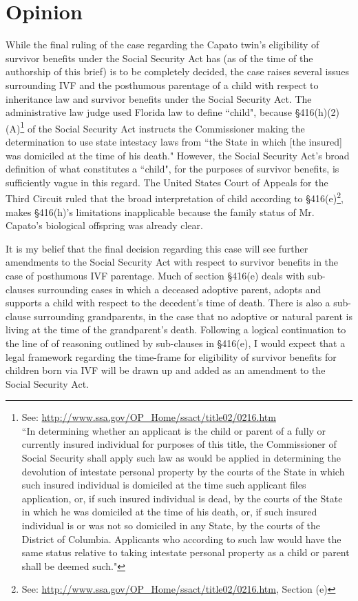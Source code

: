 \documentclass[letterpaper,10pt,twoside]{article}
\begin{document}
\section*{Opinion}
While the final ruling of the case regarding the Capato twin's eligibility of survivor benefits under the Social Security Act has (as of the time of the authorship of this brief) is to be completely decided, the case raises several issues surrounding IVF and the posthumous parentage of a child with respect to inheritance law and survivor benefits under the Social Security Act. The administrative law judge used Florida law to define ``child", because \S 416(h)(2)(A)\footnote{See: \url{http://www.ssa.gov/OP_Home/ssact/title02/0216.htm}\\``In determining whether an applicant is the child or parent of a fully or currently insured individual for purposes of this title, the Commissioner of Social Security shall apply such law as would be applied in determining the devolution of intestate personal property by the courts of the State in which such insured individual is domiciled at the time such applicant files application, or, if such insured individual is dead, by the courts of the State in which he was domiciled at the time of his death, or, if such insured individual is or was not so domiciled in any State, by the courts of the District of Columbia. Applicants who according to such law would have the same status relative to taking intestate personal property as a child or parent shall be deemed such."} of the Social Security Act instructs the Commissioner making the determination to use state intestacy laws from ``the State in which [the insured] was domiciled at the time of his death."  However, the Social Security Act's broad definition of what constitutes a ``child", for the purposes of survivor benefits, is sufficiently vague in this regard.  The United States Court of Appeals for the Third Circuit ruled that the broad interpretation of child according to \S 416(e)\footnote{See: \url{http://www.ssa.gov/OP_Home/ssact/title02/0216.htm}, Section (e)}, makes \S 416(h)'s limitations inapplicable because the family status of Mr. Capato's biological offspring was already clear.

It is my belief that the final  decision regarding this case will see further amendments to the Social Security Act with respect to survivor benefits in the case of posthumous IVF parentage.  Much of section \S 416(e) deals with sub-clauses surrounding cases in which a deceased adoptive parent, adopts and supports a child with respect to the decedent's time of death.  There is also a sub-clause surrounding grandparents, in the case that no adoptive or natural parent is living at the time of the grandparent's death.  Following a logical continuation to the line of of reasoning outlined by sub-clauses in \S 416(e), I would expect that a legal framework regarding the time-frame for eligibility of survivor benefits for children born via IVF will be drawn up and added as an amendment to the Social Security Act.
\end{document}
